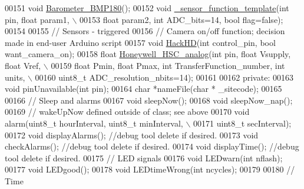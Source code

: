 \begin{DoxyCode}
00151     \textcolor{keywordtype}{void} \hyperlink{classLogger_a40588117a274f0c6de926ef6ce1f0ba8}{Barometer\_BMP180}();
00152     \textcolor{keywordtype}{void} \hyperlink{classLogger_a98f3cc370c87d1e1eaf3eb6a7e0f1623}{\_sensor\_function\_template}(\textcolor{keywordtype}{int} pin, \textcolor{keywordtype}{float} param1, \(\backslash\)
00153          \textcolor{keywordtype}{float} param2, \textcolor{keywordtype}{int} ADC\_bits=14, \textcolor{keywordtype}{bool} flag=\textcolor{keyword}{false});
00154     
00155     \textcolor{comment}{// Sensors - triggered}
00156     \textcolor{comment}{// Camera on/off function; decision made in end-user Arduino script}
00157     \textcolor{keywordtype}{void} \hyperlink{classLogger_a923b296832bd4222da649ebc66427ac1}{HackHD}(\textcolor{keywordtype}{int} control\_pin, \textcolor{keywordtype}{bool} want\_camera\_on);
00158     \textcolor{keywordtype}{float} \hyperlink{classLogger_a9808967fdf91f10602aa883df35145b3}{Honeywell\_HSC\_analog}(\textcolor{keywordtype}{int} pin, \textcolor{keywordtype}{float} Vsupply, \textcolor{keywordtype}{float} Vref, \(\backslash\)
00159           \textcolor{keywordtype}{float} Pmin, \textcolor{keywordtype}{float} Pmax, \textcolor{keywordtype}{int} TransferFunction\_number, \textcolor{keywordtype}{int} units, \(\backslash\)
00160           uint8\_t ADC\_resolution\_nbits=14);
00161 
00162   \textcolor{keyword}{private}:
00163     \textcolor{keywordtype}{void} pinUnavailable(\textcolor{keywordtype}{int} pin);
00164     \textcolor{keywordtype}{char} *nameFile(\textcolor{keywordtype}{char} * \_sitecode);
00165 
00166     \textcolor{comment}{// Sleep and alarms}
00167     \textcolor{keywordtype}{void} sleepNow();
00168     \textcolor{keywordtype}{void} sleepNow\_nap();
00169     \textcolor{comment}{// wakeUpNow defined outside of class; see above}
00170     \textcolor{keywordtype}{void} alarm(uint8\_t hourInterval, uint8\_t minInterval, \(\backslash\)
00171          uint8\_t secInterval);
00172     \textcolor{keywordtype}{void} displayAlarms(); \textcolor{comment}{//debug tool delete if desired.}
00173     \textcolor{keywordtype}{void} checkAlarms();  \textcolor{comment}{//debug tool delete if desired. }
00174     \textcolor{keywordtype}{void} displayTime();   \textcolor{comment}{//debug tool delete if desired. }
00175     \textcolor{comment}{// LED signals}
00176     \textcolor{keywordtype}{void} LEDwarn(\textcolor{keywordtype}{int} nflash);
00177     \textcolor{keywordtype}{void} LEDgood();
00178     \textcolor{keywordtype}{void} LEDtimeWrong(\textcolor{keywordtype}{int} ncycles);
00179     
00180     \textcolor{comment}{// Time}

\end{DoxyCode}
